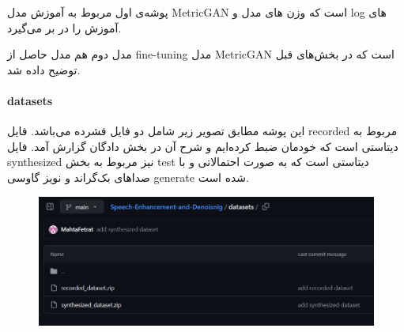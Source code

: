 \documentclass[fleqn]{report}
\begin{document}
پوشه‌ی اول مربوط به آموزش مدل MetricGAN است که وزن های مدل و log های آموزش را در بر می‌گیرد.

مدل دوم هم مدل حاصل از fine-tuning مدل MetricGAN است که در بخش‌های قبل توضیح داده شد.

\paragraph{datasets} این پوشه مطابق تصویر زیر شامل دو فایل فشرده می‌باشد.
فایل recorded مربوط به دیتاستی است که خودمان ضبط کرده‌ایم و شرح آن در بخش دادگان گزارش آمد.
فایل synthesized نیز مربوط به بخش test دیتاستی است که به صورت احتمالاتی و با صدا‌های بک‌گراند و نویز گاوسی generate شده است.

\begin{figure}[h]

    \centering
    \includegraphics[width=\textwidth, keepaspectratio]{images/datasets.jpg}
    
    \caption{}
    \label{fig:datasets}
\end{figure}
\end{document}
